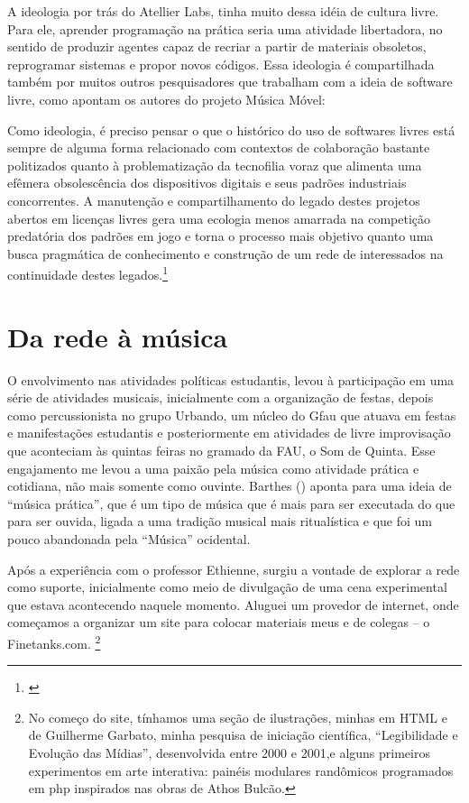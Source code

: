 A ideologia por trás do Atellier Labs, tinha muito dessa idéia de cultura livre. Para ele, aprender programação na prática seria uma atividade libertadora, no sentido de produzir agentes capaz de recriar a partir de materiais obsoletos, reprogramar sistemas e propor novos códigos. Essa ideologia é compartilhada também por muitos outros pesquisadores que trabalham com a ideia de software livre, como apontam os autores do projeto Música Móvel:

\begin{citacao}
Como ideologia, é preciso pensar o que o histórico do uso de softwares livres está sempre de alguma forma relacionado com contextos de colaboração bastante politizados quanto à problematização da tecnofilia voraz que alimenta uma efêmera obsolescência dos dispositivos digitais e seus padrões industriais concorrentes. A manutenção e compartilhamento do legado destes projetos abertos em licenças livres gera uma ecologia menos amarrada na competição predatória dos padrões em jogo e torna o processo mais objetivo quanto uma busca pragmática de conhecimento e construção de um rede de interessados na continuidade destes legados.\footnote{\cite{Rohde2014}}
\end{citacao}



\section{Da rede à música}
O envolvimento nas atividades políticas estudantis, levou à participação em uma série de atividades musicais, inicialmente com a organização de festas, depois como percussionista no grupo Urbando, um núcleo do Gfau que atuava em festas e manifestações estudantis e posteriormente em atividades de livre improvisação que aconteciam às quintas feiras no gramado da FAU, o Som de Quinta. Esse engajamento me levou a uma paixão pela música como atividade prática e cotidiana, não mais somente como ouvinte. Barthes (\citeyear{Barthes1978}) aponta para uma ideia de ``música prática'', que é um tipo de música que é mais para ser executada do que para ser ouvida, ligada a uma tradição musical mais ritualística e que foi um pouco abandonada pela ``Música'' ocidental. 


Após a experiência com o professor Ethienne, surgiu a vontade de explorar a rede como suporte, inicialmente como meio de divulgação de uma cena experimental que estava acontecendo naquele momento. Aluguei um provedor de internet, onde começamos a organizar um site para colocar materiais meus e de colegas -- o Finetanks.com. \footnote{No começo do site, tínhamos uma seção de ilustrações, minhas em HTML e de Guilherme Garbato, minha pesquisa de iniciação científica, ``Legibilidade e Evolução das Mídias'', desenvolvida entre 2000 e 2001,e alguns primeiros experimentos em arte interativa: painéis modulares randômicos programados em php inspirados nas obras de Athos Bulcão.}
   
